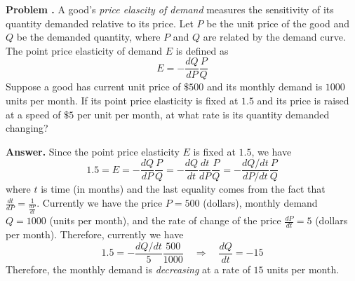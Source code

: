 \documentclass[11pt,letterpaper]{article}
\newcounter{problem}
\newcommand{\problem}{
	\stepcounter{problem}%
	\noindent \textbf{Problem \theproblem. }%
}
\newcommand{\answer}{\noindent \textbf{Answer. }}
\begin{document}
\problem A good's \textit{price elascity of demand} measures the sensitivity of its quantity demanded relative to its price.  Let $P$ be the unit price of the good and $Q$ be the demanded quantity, where $P$ and $Q$ are related by the demand curve.  The point price elasticity of demand $E$ is defined as 
\[E = -\frac{dQ}{dP}\frac{P}{Q}\]
Suppose a good has current unit price of $\$500$ and its monthly demand is $1000$ units per month. If its point price elasticity is fixed at $1.5$ and its price is raised at a speed of $\$5$ per unit per month, at what rate is its quantity demanded changing?
\vspace{6mm}

\answer Since the point price elasticity $E$ is fixed at $1.5$, we have
\[1.5 = E = -\frac{dQ}{dP}\frac{P}{Q} = -\frac{dQ}{dt}\frac{dt}{dP}\frac{P}{Q} = -\frac{dQ/dt}{dP/dt}\frac{P}{Q}\]
where $t$ is time (in months) and the last equality comes from the fact that $\frac{dt}{dP} = \frac{1}{\frac{dP}{dt}}$.  Currently we have the price $P = 500$ (dollars), monthly demand $Q = 1000$ (units per month), and the rate of change of the price $\frac{dP}{dt} = 5$ (dollars per month). Therefore, currently we have
\[1.5 = -\frac{dQ/dt}{5}\frac{500}{1000} \quad \Rightarrow \quad \frac{dQ}{dt} = -15\]
Therefore, the monthly demand is \textit{decreasing} at a rate of $15$ units per month.
\vspace{6mm}


\end{document}
